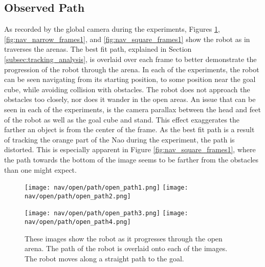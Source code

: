 \subsection{Observed Path}

As recorded by the global camera during the experiments, Figures \ref{fig:nav_open_frames1},
\ref{fig:nav_narrow_frames1}, and \ref{fig:nav_square_frames1} show the robot
as in traverses the arenas. The best fit path, explained in Section \ref{subsec:tracking_analysis},
is overlaid over each frame to better demonstrate the progression of the robot 
through the arena. In each of the experiments, the robot can be seen navigating
from its starting position, to some position near the goal cube, while avoiding
collision with obstacles. The robot does not approach the obstacles too closely,
nor does it wander in the open areas. An issue that can be seen in each of the
experiments, is the camera parallax between the head and feet of the robot as well
as the goal cube and stand. This effect exaggerates the farther an object is from
the center of the frame. As the best fit path is a result of tracking the orange part
of the Nao during the experiment, the path is distorted. This is especially
apparent in Figure \ref{fig:nav_square_frames1}, where the path towards the bottom
of the image seems to be farther from the obstacles than one might expect.

\begin{figure}
  \centerline{
    \texttt{[image: nav/open/path/open\_path1.png]}
    \texttt{[image: nav/open/path/open\_path2.png]}
  }
  \vspace*{0.05in}
  \centerline{
    \texttt{[image: nav/open/path/open\_path3.png]}
    \texttt{[image: nav/open/path/open\_path4.png]}
  }
  \caption{These images show the robot as it progresses through the open arena. 
           The path of the robot is overlaid onto each of the images.
           The robot moves along a straight path to the goal.}
  \label{fig:nav_open_frames1}
  \vspace*{-0.07in}
\end{figure}

